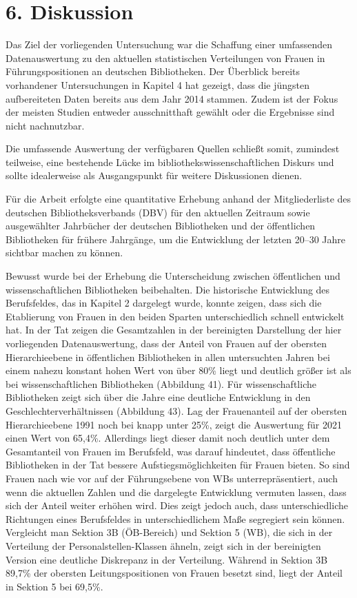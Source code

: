 \documentclass[a4paper,
fontsize=11pt,
oneside,
numbers=noperiodatend,
parskip=half-,
bibliography=totoc,
final
]{scrartcl}
\begin{document}
\hypertarget{diskussion}{%
\section{6. Diskussion}\label{diskussion}}

Das Ziel der vorliegenden Untersuchung war die Schaffung einer
umfassenden Datenauswertung zu den aktuellen statistischen Verteilungen
von Frauen in Führungspositionen an deutschen Bibliotheken. Der
Überblick bereits vorhandener Untersuchungen in Kapitel 4 hat gezeigt,
dass die jüngsten aufbereiteten Daten bereits aus dem Jahr 2014 stammen.
Zudem ist der Fokus der meisten Studien entweder ausschnitthaft gewählt
oder die Ergebnisse sind nicht nachnutzbar.

Die umfassende Auswertung der verfügbaren Quellen schließt somit,
zumindest teilweise, eine bestehende Lücke im
bibliothekswissenschaftlichen Diskurs und sollte idealerweise als
Ausgangspunkt für weitere Diskussionen dienen.

Für die Arbeit erfolgte eine quantitative Erhebung anhand der
Mitgliederliste des deutschen Bibliotheksverbands (DBV) für den
aktuellen Zeitraum sowie ausgewählter Jahrbücher der deutschen
Bibliotheken und der öffentlichen Bibliotheken für frühere Jahrgänge, um
die Entwicklung der letzten 20--30 Jahre sichtbar machen zu können.

Bewusst wurde bei der Erhebung die Unterscheidung zwischen öffentlichen
und wissenschaftlichen Bibliotheken beibehalten. Die historische
Entwicklung des Berufsfeldes, das in Kapitel 2 dargelegt wurde, konnte
zeigen, dass sich die Etablierung von Frauen in den beiden Sparten
unterschiedlich schnell entwickelt hat. In der Tat zeigen die
Gesamtzahlen in der bereinigten Darstellung der hier vorliegenden
Datenauswertung, dass der Anteil von Frauen auf der obersten
Hierarchieebene in öffentlichen Bibliotheken in allen untersuchten
Jahren bei einem nahezu konstant hohen Wert von über 80\% liegt und
deutlich größer ist als bei wissenschaftlichen Bibliotheken (Abbildung
41). Für wissenschaftliche Bibliotheken zeigt sich über die Jahre eine
deutliche Entwicklung in den Geschlechterverhältnissen (Abbildung 43).
Lag der Frauenanteil auf der obersten Hierarchieebene 1991 noch bei
knapp unter 25\%, zeigt die Auswertung für 2021 einen Wert von 65,4\%.
Allerdings liegt dieser damit noch deutlich unter dem Gesamtanteil von
Frauen im Berufsfeld, was darauf hindeutet, dass öffentliche
Bibliotheken in der Tat bessere Aufstiegsmöglichkeiten für Frauen
bieten. So sind Frauen nach wie vor auf der Führungsebene von WBs
unterrepräsentiert, auch wenn die aktuellen Zahlen und die dargelegte
Entwicklung vermuten lassen, dass sich der Anteil weiter erhöhen wird.
Dies zeigt jedoch auch, dass unterschiedliche Richtungen eines
Berufsfeldes in unterschiedlichem Maße segregiert sein können.
Vergleicht man Sektion 3B (ÖB-Bereich) und Sektion 5 (WB), die sich in
der Verteilung der Personalstellen-Klassen ähneln, zeigt sich in der
bereinigten Version eine deutliche Diskrepanz in der Verteilung. Während
in Sektion 3B 89,7\% der obersten Leitungspositionen von Frauen besetzt
sind, liegt der Anteil in Sektion 5 bei 69,5\%.
\end{document}
